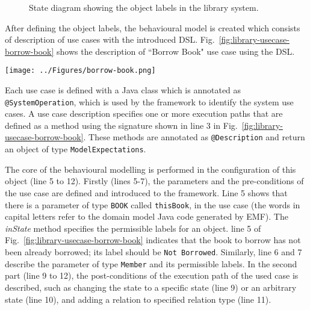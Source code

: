 \begin{figure}[h]
\centering
{}
\hfil
{}
\caption{State diagram showing the object labels in the library system.}
\label{fig:library-object-labels}
\end{figure} 

After defining the object labels, the behavioural model is created which consists of description of use cases with the introduced DSL. Fig.~\ref{fig:library-usecase-borrow-book} shows the description of ``Borrow Book" use case using the DSL. 

\begin{figure*}[h]
\centering
\texttt{[image: ../Figures/borrow-book.png]}
\caption{The behavioural modelling for ``Borrow Book" use case using our DSL.}
\label{fig:library-usecase-borrow-book}
\end{figure*}

Each use case is defined with a Java class which is annotated as \texttt{@SystemOperation}, which is used by the framework to identify the system use cases. A use case description specifies one or more execution paths that are defined as a method using the signature shown in line 3 in Fig.~\ref{fig:library-usecase-borrow-book}. These methods are annotated as \texttt{@Description} and return an object of type \texttt{ModelExpectations}. 

The core of the behavioural modelling is performed in the configuration of this object (line 5 to 12). Firstly (lines 5-7), the parameters and the pre-conditions of the use case are defined and introduced to the framework. Line 5 shows that there is a parameter of type \texttt{BOOK} called \texttt{thisBook}, in the use case (the words in capital letters refer to the domain model Java code generated by EMF). The \textit{inState} method specifies the permissible labels for an object. line 5 of Fig.~\ref{fig:library-usecase-borrow-book} indicates that the book to borrow has not been already borrowed; its label should be \texttt{Not Borrowed}. Similarly, line 6 and 7 describe the parameter of type \texttt{Member} and its permissible labels.
In the second part (line 9 to 12), the post-conditions of the execution path of the used case is described, such as changing the state to a specific state (line 9) or an arbitrary state (line 10), and adding a relation to specified relation type (line 11). 

